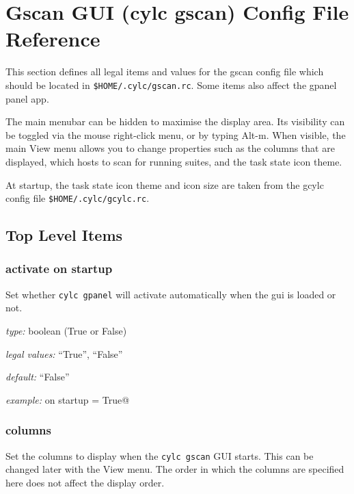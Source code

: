 
\section{Gscan GUI (cylc gscan) Config File Reference}
\label{GscanRCReference}

\lstset{language=bash}

This section defines all legal items and values for the gscan config
file which should be located in \lstinline=$HOME/.cylc/gscan.rc=. Some items
also affect the gpanel panel app.

The main menubar can be hidden to maximise the display area. Its visibility
can be toggled via the mouse right-click menu, or by typing Alt-m. When
visible, the main View menu allows you to change properties such as the columns
that are displayed, which hosts to scan for running suites, and the task state
icon theme.

At startup, the task state icon theme and icon size are taken from the gcylc
config file \lstinline=$HOME/.cylc/gcylc.rc=.

\subsection{Top Level Items}

\subsubsection{activate on startup}

Set whether \lstinline=cylc gpanel= will activate automatically when the gui is
loaded or not.

\begin{myitemize}
    \item {\em type:} boolean (True or False)
\item {\em legal values:} ``True'', ``False''
\item {\em default:} ``False''
\item {\em example:} \lstinline@activate on startup = True@
\end{myitemize}

\subsubsection{columns}

Set the columns to display when the \lstinline=cylc gscan= GUI starts. This can
be changed later with the View menu.  The order in which the columns are
specified here does not affect the display order.

